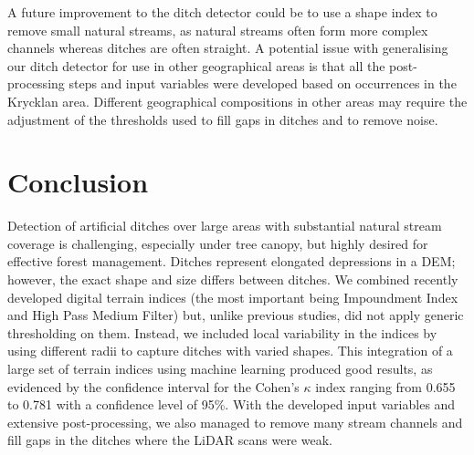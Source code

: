 \documentclass[]{interact}
\theoremstyle{plain}%
\theoremstyle{definition}
\theoremstyle{remark}
\begin{document}
A future improvement to the ditch detector could be to use a shape index to remove small natural streams, as natural streams often form more complex channels whereas ditches are often straight. A potential issue with generalising our ditch detector for use in other geographical areas is that all the post-processing steps and input variables were developed based on occurrences in the Krycklan area. Different geographical compositions in other areas may require the adjustment of the thresholds used to fill gaps in ditches and to remove noise.

\section{Conclusion}


Detection of artificial ditches over large areas with substantial natural stream coverage is challenging, especially under tree canopy, but highly desired for effective forest management. Ditches represent elongated depressions in a DEM; however, the exact shape and size differs between ditches. We combined recently developed digital terrain indices (the most important being Impoundment Index and High Pass Medium Filter) but, unlike previous studies, did not apply generic thresholding on them. Instead, we included local variability in the indices by using different radii to capture ditches with varied shapes. This integration of a large set of terrain indices using machine learning produced good results, as evidenced by the confidence interval for the Cohen's $\kappa$ index ranging from 0.655 to 0.781 with a confidence level of 95\%. With the developed input variables and extensive post-processing, we also managed to remove many stream channels and fill gaps in the ditches where the LiDAR scans were weak. 
\end{document}

